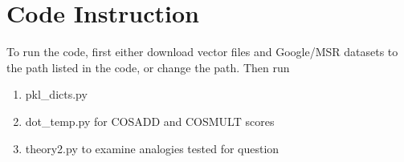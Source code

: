 \documentclass{article}
\begin{document}
\section{Code Instruction}
To run the code, first either download vector files and Google/MSR datasets to the path listed in the
code, or change the path. Then run 

\begin{enumerate}
\item pkl\_dicts.py
\item dot\_temp.py for COSADD and COSMULT scores
\item theory2.py to examine analogies tested for question
\end{enumerate}
\end{document}
